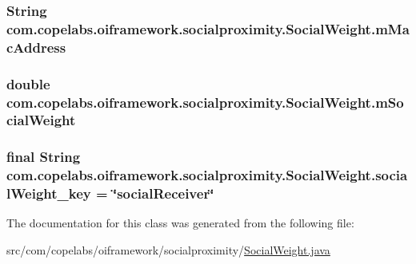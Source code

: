 \subsubsection[{m\+Mac\+Address}]{\setlength{\rightskip}{0pt plus 5cm}String com.\+copelabs.\+oiframework.\+socialproximity.\+Social\+Weight.\+m\+Mac\+Address\hspace{0.3cm}{\ttfamily [private]}}\label{classcom_1_1copelabs_1_1oiframework_1_1socialproximity_1_1_social_weight_a93b91c868be4a9d3e395d46242ab96c4}
\hypertarget{classcom_1_1copelabs_1_1oiframework_1_1socialproximity_1_1_social_weight_a4c005dbeda3565c7049babdb95a391c7}{}
\subsubsection[{m\+Social\+Weight}]{\setlength{\rightskip}{0pt plus 5cm}double com.\+copelabs.\+oiframework.\+socialproximity.\+Social\+Weight.\+m\+Social\+Weight\hspace{0.3cm}{\ttfamily [private]}}\label{classcom_1_1copelabs_1_1oiframework_1_1socialproximity_1_1_social_weight_a4c005dbeda3565c7049babdb95a391c7}
\hypertarget{classcom_1_1copelabs_1_1oiframework_1_1socialproximity_1_1_social_weight_a7f08f601ecd8ad6f108323f0d5a5d2b1}{}
\subsubsection[{social\+Weight\+\_\+key}]{\setlength{\rightskip}{0pt plus 5cm}final String com.\+copelabs.\+oiframework.\+socialproximity.\+Social\+Weight.\+social\+Weight\+\_\+key = \char`\"{}social\+Receiver\char`\"{}\hspace{0.3cm}{\ttfamily [static]}}\label{classcom_1_1copelabs_1_1oiframework_1_1socialproximity_1_1_social_weight_a7f08f601ecd8ad6f108323f0d5a5d2b1}


The documentation for this class was generated from the following file\+:\begin{DoxyCompactItemize}
\item 
src/com/copelabs/oiframework/socialproximity/\hyperlink{_social_weight_8java}{Social\+Weight.\+java}\end{DoxyCompactItemize}

